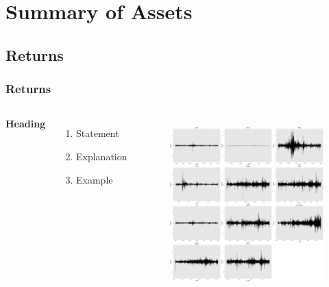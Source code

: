 \documentclass{beamer}
\newcommand\Fontviii{\fontsize{8}{9.2}\selectfont}
\begin{document}
\section{Summary of Assets}
\subsection{Returns}

\begin{frame}
\frametitle{Returns}
\Fontviii
\begin{columns}[c] %

\textbf{Heading}
\begin{enumerate}
\item Statement
\item Explanation
\item Example
\end{enumerate}

\begin{figure}[h]
\centering 
\includegraphics[width=6.5cm]{../results/returns}
\label{fig: dailyReturns}
\end{figure}
\end{columns}
\end{frame}

\end{document}
